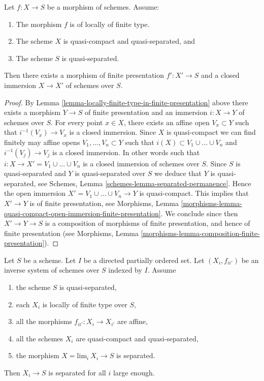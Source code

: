 \begin{lemma}
\label{lemma-finite-type-closed-in-finite-presentation}
Let $f : X \to S$ be a morphism of schemes.
Assume:
\begin{enumerate}
\item The morphism $f$ is of locally of finite type.
\item The scheme $X$ is quasi-compact and quasi-separated, and
\item The scheme $S$ is quasi-separated.
\end{enumerate}
Then there exists a morphism of finite presentation
$f' : X' \to S$ and a closed immersion $X \to X'$ of schemes over $S$.
\end{lemma}

\begin{proof}
By Lemma \ref{lemma-locally-finite-type-in-finite-presentation} above
there exists a morphism $Y \to S$ of finite presentation and an
immersion $i : X \to Y$ of schemes over $S$.
For every point $x \in X$, there exists an affine open
$V_x \subset Y$ such that $i^{-1}(V_x) \to V_x$ is a
closed immersion. Since $X$ is quasi-compact we can find
finitely may affine opens $V_1, \ldots, V_n \subset Y$
such that $i(X) \subset V_1 \cup \ldots \cup V_n$ and
$i^{-1}(V_j) \to V_j$ is a closed immersion. In other words
such that $i : X \to X' = V_1 \cup \ldots \cup V_n$ is a
closed immersion of schemes over $S$.
Since $S$ is quasi-separated and $Y$ is quasi-separated over $S$
we deduce that $Y$ is quasi-separated, see
Schemes, Lemma \ref{schemes-lemma-separated-permanence}.
Hence the open immersion $X' = V_1 \cup \ldots \cup V_n \to Y$
is quasi-compact. This implies that
$X' \to Y$ is of finite presentation, see
Morphisms,
Lemma \ref{morphisms-lemma-quasi-compact-open-immersion-finite-presentation}.
We conclude since then $X' \to Y \to S$ is a composition of morphisms
of finite presentation, and hence of finite presentation (see
Morphisms, Lemma \ref{morphisms-lemma-composition-finite-presentation}).
\end{proof}

\begin{lemma}
\label{lemma-eventually-separated}
Let $S$ be a scheme.
Let $I$ be a directed partially ordered set.
Let $(X_i, f_{ii'})$ be an inverse system of schemes over $S$ indexed by $I$.
Assume
\begin{enumerate}
\item the scheme $S$ is quasi-separated,
\item each $X_i$ is locally of finite type over $S$,
\item all the morphisms $f_{ii'} : X_i \to X_{i'}$ are affine,
\item all the schemes $X_i$ are quasi-compact and quasi-separated,
\item the morphism $X = \text{lim}_i\ X_i \to S$ is separated.
\end{enumerate}
Then $X_i \to S$ is separated for all $i$ large enough.
\end{lemma}

